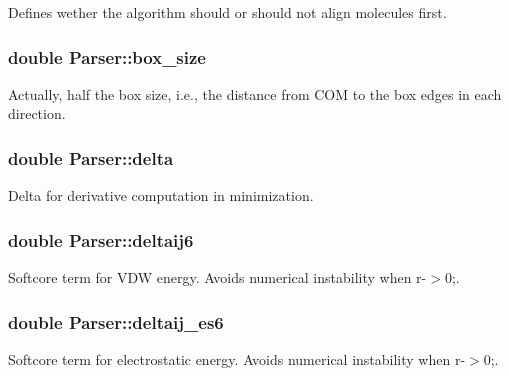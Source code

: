 Defines wether the algorithm should or should not align molecules first. 

\hypertarget{classParser_a10e43de411867ce8d978b4da09595274}{
\subsubsection[{box\_\-size}]{\setlength{\rightskip}{0pt plus 5cm}double {\bf Parser::box\_\-size}}}
\label{classParser_a10e43de411867ce8d978b4da09595274}


Actually, half the box size, i.e., the distance from COM to the box edges in each direction. 

\hypertarget{classParser_a8cc4bd73e4cefb212d6db5ef3e9c5825}{
\subsubsection[{delta}]{\setlength{\rightskip}{0pt plus 5cm}double {\bf Parser::delta}}}
\label{classParser_a8cc4bd73e4cefb212d6db5ef3e9c5825}


Delta for derivative computation in minimization. 

\hypertarget{classParser_a37e294cd788ca37540592f9bff930757}{
\subsubsection[{deltaij6}]{\setlength{\rightskip}{0pt plus 5cm}double {\bf Parser::deltaij6}}}
\label{classParser_a37e294cd788ca37540592f9bff930757}


Softcore term for VDW energy. Avoids numerical instability when r-\/$>$0;. 

\hypertarget{classParser_ae28df0a3a3e5ee001ece1bec87f34aca}{
\subsubsection[{deltaij\_\-es6}]{\setlength{\rightskip}{0pt plus 5cm}double {\bf Parser::deltaij\_\-es6}}}
\label{classParser_ae28df0a3a3e5ee001ece1bec87f34aca}


Softcore term for electrostatic energy. Avoids numerical instability when r-\/$>$0;. 

